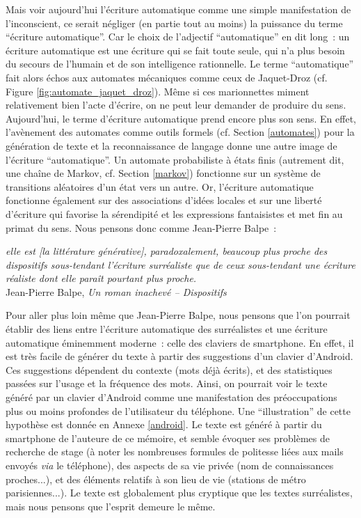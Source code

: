 \documentclass{article}
\newenvironment{citationbox}
{\begin{center}
		\begin{minipage}{.8\textwidth}
		}
		{
		\end{minipage}	
\end{center}
}
\begin{document}
				Mais voir aujourd’hui l'écriture automatique comme une simple manifestation de l'inconscient, ce serait négliger (en partie tout au moins) la puissance du terme ``écriture automatique''. Car le choix de l'adjectif ``automatique'' en dit long~: un écriture automatique est une écriture qui se fait toute seule, qui n'a plus besoin du secours de l'humain et de son intelligence rationnelle. Le terme ``automatique'' fait alors échos aux automates mécaniques comme ceux de Jaquet-Droz (cf. Figure \ref{fig:automate_jaquet_droz}). Même si ces marionnettes miment relativement bien l'acte d'écrire, on ne peut leur demander de produire du sens.\\
				
				Aujourd'hui, le terme d'écriture automatique prend encore plus son sens. En effet, l'avènement des automates comme outils formels (cf. Section \ref{automates}) pour la génération de texte et la reconnaissance de langage donne une autre image de l'écriture ``automatique''. Un automate probabiliste à états finis (autrement dit, une chaîne de Markov, cf. Section \ref{markov}) fonctionne sur un système de transitions aléatoires d'un état vers un autre. Or, l'écriture automatique fonctionne également sur des associations d'idées locales et sur une liberté d'écriture qui favorise la sérendipité et les expressions fantaisistes et met fin au primat du sens. Nous pensons donc comme Jean-Pierre Balpe~:
				\begin{citationbox}
					\textit{elle est [la littérature générative], paradoxalement, beaucoup plus proche des dispositifs sous-tendant l'écriture surréaliste que de ceux sous-tendant une écriture réaliste dont elle paraît pourtant plus proche.}\\
					Jean-Pierre Balpe, \textit{Un roman inachevé -- Dispositifs}\cite{balpe1994}
				\end{citationbox}
				Pour aller plus loin même que Jean-Pierre Balpe, nous pensons que l'on pourrait établir des liens entre l'écriture automatique des surréalistes et une écriture automatique éminemment moderne~: celle des claviers de smartphone. En effet, il est très facile de générer du texte à partir des suggestions d'un clavier d'Android. Ces suggestions dépendent du contexte (mots déjà écrits), et des statistiques passées sur l'usage et la fréquence des mots. Ainsi, on pourrait voir le texte généré par un clavier d'Android comme une manifestation des préoccupations plus ou moins profondes de l'utilisateur du téléphone. Une ``illustration'' de cette hypothèse est donnée en Annexe \ref{android}. Le texte est généré à partir du smartphone de l'auteure de ce mémoire, et semble évoquer ses problèmes de recherche de stage (à noter les nombreuses formules de politesse liées aux mails envoyés \textit{via} le téléphone), des aspects de sa vie privée (nom de connaissances proches...), et des éléments relatifs à son lieu de vie (stations de métro parisiennes...). Le texte est globalement plus cryptique que les textes surréalistes, mais nous pensons que l'esprit demeure le même.\\
				
\end{document}
